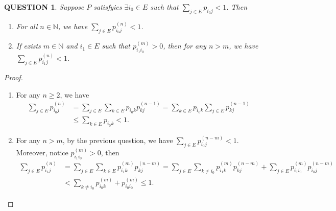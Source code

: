 \documentclass[12pt]{article}
\renewcommand{\(}{\left(}%
\renewcommand{\)}{\right)}%
\renewcommand{\[}{\left[}%
\renewcommand{\]}{\right]}%
\newcommand{\n}{\mathbb{N}}
\newtheorem{question}{QUESTION}[section]}
\newtheorem{proof}{Proof.}}
\begin{document}
  \begin{question}
  	Suppose $P$ satisfyies $\exists i_0\in E$ such that $\sum_{j\in E}p_{i_0j}<1$. Then
  	\begin{enumerate}
  		\item For all $n\in\n$, we have $\sum_{j\in E}p_{i_0j}^{(n)}<1$.
  		\item If exists $m\in\n$ and $i_1\in E$ such that $p_{i_1i_0}^{(m)}>0$, then for any $n>m$, we have $\sum_{j\in E}p_{i_1j}^{(n)}<1$.
  	\end{enumerate}
  \end{question}
  \begin{proof}
  	\begin{enumerate}
  		\item For any  $n\geq 2$, we have
  		\begin{equation*}
  			\begin{split}
  				\sum_{j\in E}p_{i_0j}^{(n)}&=\sum_{j\in E}\sum_{k\in E}p_{i_0k}p_{k j}^{(n-1)}=\sum_{k\in E}p_{i_0k}\sum_{j\in E}p_{k j}^{(n-1)}\\
  				&\leq \sum_{k\in E}p_{i_0k}<1.
  			\end{split}
  		\end{equation*}
  		\item For any $n>m$, by the previous question, we have $\sum_{j\in E}p_{i_0 j}^{(n-m)}<1$. Moreover, notice $p_{i_1i_0}^{(m)}>0$, then 
  		\begin{equation*}
  			\begin{split}
  				\sum_{j\in E}p_{i_1j}^{(n)}&=\sum_{j\in E}\sum_{k\in E}p_{i_1k}^{(m)}p_{k j}^{(n-m)}=\sum_{j\in E}\sum_{k\neq i_0}p_{i_1k}^{(m)}p_{k j}^{(n-m)}+\sum_{j\in E}p_{i_1i_0}^{(m)}p_{i_0 j}^{(n-m)}\\
  				&<\sum_{k\neq i_0}p_{i_0k}^{(m)}+p_{i_0i_0}^{(m)}\leq 1.
  			\end{split}
  		\end{equation*}
  	\end{enumerate}
  \end{proof}
  
\end{document}
